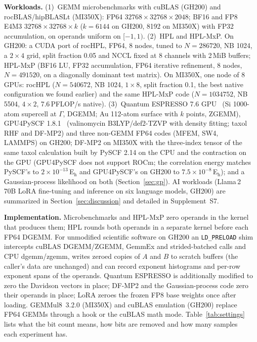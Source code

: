 \documentclass[conference]{IEEEtran}
\newcommand{\Eh}{\,E$_\mathrm{h}$}
\newcommand{\ee}[2]{#1{\times}10^{#2}}  %
\begin{document}
\textbf{Workloads.} (1)~GEMM microbenchmarks with cuBLAS (GH200) and rocBLAS/hipBLASLt (MI350X): FP64
$32768{\times}32768{\times}2048$; BF16 and FP8 E4M3 $32768{\times}32768{\times}k$ ($k=6144$ on GH200, 8192 on MI350X) with
FP32 accumulation, on operands uniform on $[-1,1)$. (2)~HPL and HPL-MxP. On GH200: a CUDA port of rocHPL, FP64, 8 nodes,
tuned to $N=286720$, NB 1024, a $2\times4$ grid, split fraction 0.05 and NCCL fixed at 8 channels with 2\,MiB buffers;
HPL-MxP (BF16 LU, FP32 accumulation, FP64 iterative refinement, 8 nodes, $N=491520$, on a diagonally dominant test
matrix). On MI350X, one node of 8 GPUs: rocHPL ($N=540672$, NB 1024, $1\times8$, split fraction 0.1, the best
native configuration we found earlier) and the same HPL-MxP code ($N=1034752$, NB 5504, $4\times2$, 7.6\,PFLOP/s native).
(3)~Quantum ESPRESSO 7.6 GPU~\cite{Giannozzi2020} (Si 1000-atom supercell at $\Gamma$, DGEMM; Au 112-atom surface with
$k$ points, ZGEMM), GPU4PySCF 1.8.1~\cite{Wu2025,Li2025} (valinomycin B3LYP/def2-TZVP with density fitting; taxol RHF and
DF-MP2) and three non-GEMM FP64 codes (MFEM, SW4, LAMMPS) on GH200; DF-MP2 on MI350X with the three-index tensor of
the same taxol calculation built by PySCF 2.14 on the CPU and the contraction on the GPU (GPU4PySCF does not support
ROCm; the correlation energy matches PySCF's to $\ee{2}{-13}$\Eh{} and GPU4PySCF's on GH200 to $\ee{7.5}{-8}$\Eh); and a
Gaussian-process likelihood on both (Section~\ref{sec:gp}). AI workloads (Llama\,2 70B LoRA fine-tuning and inference
on six language models, GH200) are summarized in Section~\ref{sec:discussion} and detailed in Supplement~S7.

\textbf{Implementation.} Microbenchmarks and HPL-MxP zero operands in the kernel that produces them; HPL rounds both
operands in a separate kernel before each FP64 DGEMM. For unmodified scientific software on GH200 an
\texttt{LD\_PRELOAD} shim intercepts cuBLAS DGEMM/ZGEMM, GemmEx and strided-batched calls and CPU dgemm/zgemm, writes
zeroed copies of $A$ and $B$ to scratch buffers (the caller's data are unchanged) and can record exponent histograms
and per-row exponent spans of the operands. Quantum ESPRESSO is additionally modified to zero the Davidson vectors in
place; DF-MP2 and the Gaussian-process code zero their operands in place; LoRA zeroes the frozen FP8 base weights once
after loading. GEMMul8~3.2.0 (MI350X) and cuBLAS emulation (GH200) replace FP64 GEMMs through a hook or the cuBLAS math
mode. Table~\ref{tab:settings} lists what the bit count means, how bits are removed and how many samples each experiment
has.
\end{document}
